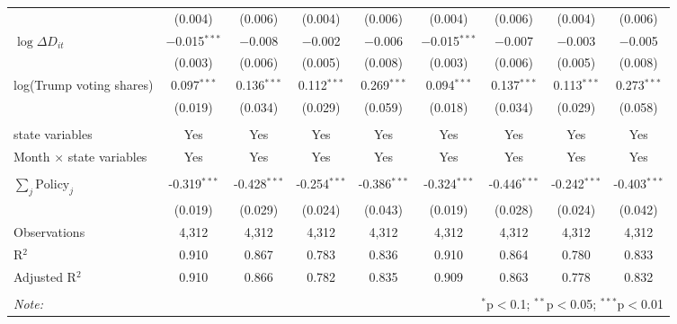 \begin{tabular}{@{\extracolsep{1pt}}lcccccccc}
  & (0.004) & (0.006) & (0.004) & (0.006) & (0.004) & (0.006) & (0.004) & (0.006) \\ 
  $\log \Delta D_{it}$ & $-$0.015$^{***}$ & $-$0.008 & $-$0.002 & $-$0.006 & $-$0.015$^{***}$ & $-$0.007 & $-$0.003 & $-$0.005 \\ 
  & (0.003) & (0.006) & (0.005) & (0.008) & (0.003) & (0.006) & (0.005) & (0.008) \\ 
  log(Trump voting shares) & 0.097$^{***}$ & 0.136$^{***}$ & 0.112$^{***}$ & 0.269$^{***}$ & 0.094$^{***}$ & 0.137$^{***}$ & 0.113$^{***}$ & 0.273$^{***}$ \\ 
  & (0.019) & (0.034) & (0.029) & (0.059) & (0.018) & (0.034) & (0.029) & (0.058) \\ 
 \hline \\[-1.8ex] 
state variables & Yes & Yes & Yes & Yes & Yes & Yes & Yes & Yes \\ 
Month $\times$ state variables & Yes & Yes & Yes & Yes & Yes & Yes & Yes & Yes \\ 
\hline \\[-1.8ex] 
$\sum_j \mathrm{Policy}_j$ & -0.319$^{***}$ & -0.428$^{***}$ & -0.254$^{***}$ & -0.386$^{***}$ & -0.324$^{***}$ & -0.446$^{***}$ & -0.242$^{***}$ & -0.403$^{***}$ \\ 
 & (0.019) & (0.029) & (0.024) & (0.043) & (0.019) & (0.028) & (0.024) & (0.042) \\ 
Observations & 4,312 & 4,312 & 4,312 & 4,312 & 4,312 & 4,312 & 4,312 & 4,312 \\ 
R$^{2}$ & 0.910 & 0.867 & 0.783 & 0.836 & 0.910 & 0.864 & 0.780 & 0.833 \\ 
Adjusted R$^{2}$ & 0.910 & 0.866 & 0.782 & 0.835 & 0.909 & 0.863 & 0.778 & 0.832 \\ 
\hline 
\hline \\[-1.8ex] 
\textit{Note:}  & \multicolumn{8}{r}{$^{*}$p$<$0.1; $^{**}$p$<$0.05; $^{***}$p$<$0.01} \\ 
\end{tabular} 